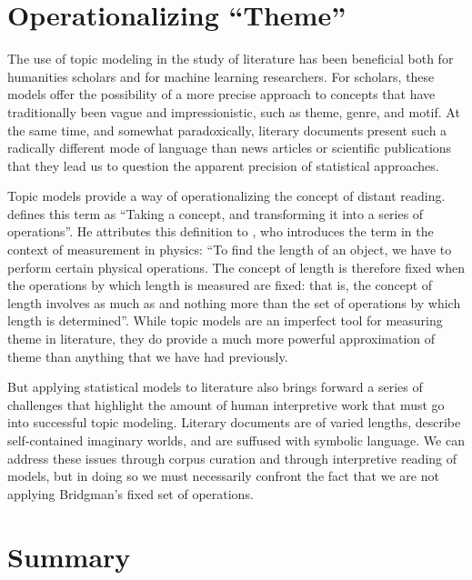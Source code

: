 {\section{Operationalizing ``Theme''}

The use of topic modeling in the study of literature has been beneficial both for humanities scholars and for machine learning researchers.
For scholars, these models offer the possibility of a more precise approach to concepts that have traditionally been vague and impressionistic, such as theme, genre, and motif.
At the same time, and somewhat paradoxically, literary documents present such a radically different mode of language than news articles or scientific publications that they lead us to question the apparent precision of statistical approaches.

Topic models provide a way of operationalizing the concept of distant reading.
\citet{moretti2013operationalizing} defines this term as ``Taking a concept, and transforming it into a series of operations''.
He attributes this definition to \citet{bridgman1927logic},  who introduces the term in the context of measurement in physics: ``To find the length of an object, we have to perform certain physical operations. The concept of length is therefore fixed when the operations by which length is measured are fixed: that is, the concept of length involves as much as and nothing more than the set of operations by which length is determined''.
While topic models are an imperfect tool for measuring theme in literature, they do provide a much more powerful approximation of theme than anything that we have had previously.

But applying statistical models to literature also brings forward a series of challenges that highlight the amount of human interpretive work that must go into successful topic modeling.
Literary documents are of varied lengths, describe self-contained imaginary worlds, and are suffused with symbolic language.
We can address these issues through corpus curation and through interpretive reading of models, but in doing so we must necessarily confront the fact that we are not applying Bridgman's fixed set of operations.

\section{Summary}

}
